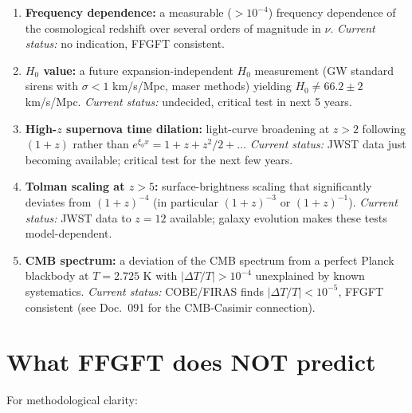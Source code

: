 \begin{enumerate}[leftmargin=2em,itemsep=4pt,topsep=2pt]
  \item \textbf{Frequency dependence:}
        a measurable ($> 10^{-4}$) frequency dependence of the
        cosmological redshift over several orders of magnitude in $\nu$.
        \emph{Current status:} no indication, FFGFT consistent.

  \item \textbf{$H_0$ value:}
        a future expansion-independent $H_0$ measurement
        (GW standard sirens with $\sigma < 1$ km/s/Mpc, maser methods)
        yielding $H_0 \neq 66.2 \pm 2$ km/s/Mpc.
        \emph{Current status:} undecided, critical test in next 5 years.

  \item \textbf{High-$z$ supernova time dilation:}
        light-curve broadening at $z > 2$ following $(1+z)$ rather
        than $e^{\xi_0 x} = 1 + z + z^2/2 + \ldots$
        \emph{Current status:} JWST data just becoming available;
        critical test for the next few years.

  \item \textbf{Tolman scaling at $z > 5$:}
        surface-brightness scaling that significantly deviates from
        $(1+z)^{-4}$ (in particular $(1+z)^{-3}$ or $(1+z)^{-1}$).
        \emph{Current status:} JWST data to $z = 12$ available;
        galaxy evolution makes these tests model-dependent.

  \item \textbf{CMB spectrum:}
        a deviation of the CMB spectrum from a perfect Planck
        blackbody at $T = 2.725$ K with $|\Delta T/T| > 10^{-4}$
        unexplained by known systematics.
        \emph{Current status:} COBE/FIRAS finds
        $|\Delta T/T| < 10^{-5}$, FFGFT consistent (see Doc.~091
        for the CMB-Casimir connection).
\end{enumerate}

\section{What FFGFT does NOT predict}

For methodological clarity:

